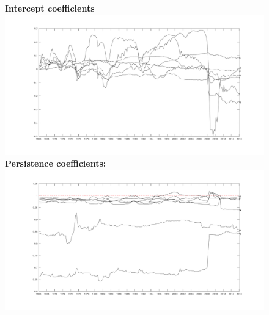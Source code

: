 \documentclass[12pt,reqno]{article}
\numberwithin{equation}{section}
\begin{document}
\begin{figure}[H]
\textbf{Intercept coefficients }\\
\includegraphics[scale=0.5]{sw_ar1_learning_alphas.pdf}
\textbf{Persistence coefficients:}\\
\includegraphics[scale=0.5]{sw_ar1_learning_betas.pdf}
\end{figure}
\end{document}
